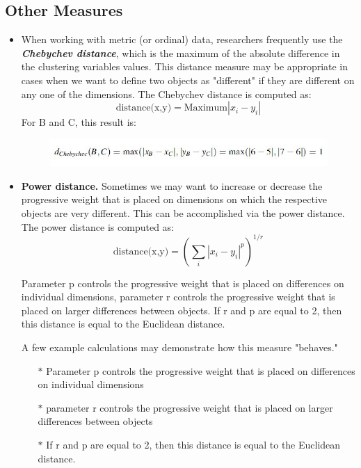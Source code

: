\documentclass[a4paper,12pt]{report}
\begin{document}
\subsection{Other Measures}
\begin{itemize}
\item When working with metric (or ordinal) data, researchers frequently use
the \textbf{\textit{Chebychev distance}}, which is the maximum of the absolute difference in the
clustering variables values. This distance measure may be appropriate in cases when we want to define two objects as "different" if they are different on any one of the dimensions. The Chebychev distance is computed as:
\[\mbox{distance(x,y)} = \mbox{Maximum}|x_i - y_i|\] For B and C, this result is:

\begin{figure}[h!]
	\begin{center}
		\includegraphics[scale=0.6]{images/Chebyshev.jpg}\\
	\end{center}
\end{figure}


\item \textbf{Power distance.} Sometimes we may want to increase or decrease the progressive weight that is placed on dimensions on which the respective objects are very different. This can be accomplished via the power distance. The power distance is computed as:
\[\mbox{distance(x,y)}  = (\sum_i |x_i - y_i|^p)^{1/r}\]

Parameter p controls the progressive weight that is placed on differences on individual dimensions, parameter r controls the progressive weight that is placed on larger differences between objects. If r and p are equal to 2, then this distance is equal to the Euclidean distance.

A few example calculations may demonstrate how this measure "behaves." 
\begin{itemize}
\item[$\ast$] Parameter p controls the progressive weight that is placed on differences on individual dimensions
\item[$\ast$] parameter r controls the progressive weight that is placed on larger differences between objects
\item[$\ast$] If r and p are equal to 2, then this distance is equal to the Euclidean distance.
\end{itemize}


\end{itemize}
\end{document}

